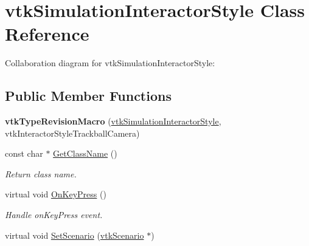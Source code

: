 \hypertarget{classvtkSimulationInteractorStyle}{
\section{vtkSimulationInteractorStyle Class Reference}
\label{classvtkSimulationInteractorStyle}
}


Collaboration diagram for vtkSimulationInteractorStyle:\subsection*{Public Member Functions}
\begin{DoxyCompactItemize}
\item 
\hypertarget{classvtkSimulationInteractorStyle_a7e90061c0825ee2e7c0a5a3228b62d38}{
{\bfseries vtkTypeRevisionMacro} (\hyperlink{classvtkSimulationInteractorStyle}{vtkSimulationInteractorStyle}, vtkInteractorStyleTrackballCamera)}
\label{classvtkSimulationInteractorStyle_a7e90061c0825ee2e7c0a5a3228b62d38}

\item 
\hypertarget{classvtkSimulationInteractorStyle_a905c1773869830cef1477238edf6aa4c}{
const char $\ast$ \hyperlink{classvtkSimulationInteractorStyle_a905c1773869830cef1477238edf6aa4c}{GetClassName} ()}
\label{classvtkSimulationInteractorStyle_a905c1773869830cef1477238edf6aa4c}

\begin{DoxyCompactList}\small\item\em Return class name. \item\end{DoxyCompactList}\item 
\hypertarget{classvtkSimulationInteractorStyle_a715e11a542317b5600adfdee1c26a4b8}{
virtual void \hyperlink{classvtkSimulationInteractorStyle_a715e11a542317b5600adfdee1c26a4b8}{OnKeyPress} ()}
\label{classvtkSimulationInteractorStyle_a715e11a542317b5600adfdee1c26a4b8}

\begin{DoxyCompactList}\small\item\em Handle onKeyPress event. \item\end{DoxyCompactList}\item 
\hypertarget{classvtkSimulationInteractorStyle_ab0cdbff20fea00cfdf694a73cb0dc70e}{
virtual void \hyperlink{classvtkSimulationInteractorStyle_ab0cdbff20fea00cfdf694a73cb0dc70e}{SetScenario} (\hyperlink{classvtkScenario}{vtkScenario} $\ast$)}
\label{classvtkSimulationInteractorStyle_ab0cdbff20fea00cfdf694a73cb0dc70e}


\end{DoxyCompactItemize}
